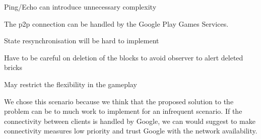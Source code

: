 
\begin{description}[style=nextline]
  \item[R1\label{r1}] Ping/Echo can introduce unnecessary complexity
  \item[N1\label{n1}] The \gls{p2p} connection can be handled by the Google Play Games Services.
  \item[R2\label{r2}] State resynchronisation will be hard to implement
  \item[R3\label{r3}] Have to be careful on deletion of the blocks to avoid observer to alert deleted bricks
  \item[R4\label{r4}] May restrict the flexibility in the gameplay
\end{description}

We chose this scenario because we think that the proposed solution to the problem can be to much work to implement for an infrequent scenario. If the connectivity between clients is handled by Google, we can would suggest to make connectivity measures low priority and trust Google with the network availability.
